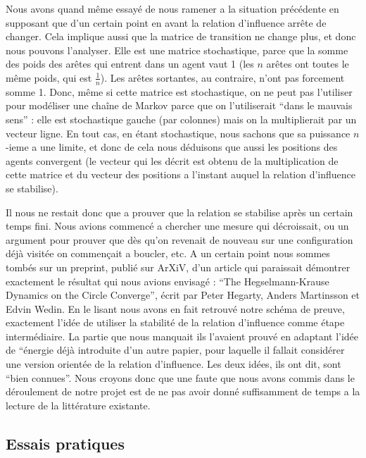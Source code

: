\documentclass[a4paper,10pt]{article}
\begin{document}
Nous avons quand même essayé de nous ramener a la situation précédente en supposant que d'un certain point en avant la relation d'influence arrête de changer. Cela implique aussi que la matrice de transition ne change plus, et donc nous pouvons l'analyser. Elle est une matrice stochastique, parce que la somme des poids des arêtes qui entrent dans un agent vaut 1 (les $n$ arêtes ont toutes le même poids, qui est $\frac{1}{n}$). Les arêtes sortantes, au contraire, n'ont pas forcement somme 1. Donc, même si cette matrice est stochastique, on ne peut pas l'utiliser pour modéliser une chaîne de Markov parce que on l'utiliserait ``dans le mauvais sens'' : elle est stochastique gauche (par colonnes) mais on la multiplierait par un vecteur ligne. En tout cas, en étant stochastique, nous sachons que sa puissance $n$-ieme a une limite, et donc de cela nous déduisons que aussi les positions des agents convergent (le vecteur qui les décrit est obtenu de la multiplication de cette matrice et du vecteur des positions a l'instant auquel la relation d'influence se stabilise).

Il nous ne restait donc que a prouver que la relation se stabilise après un certain temps fini. Nous avions commencé a chercher une mesure qui décroissait, ou un argument pour prouver que dès qu'on revenait de nouveau sur une configuration déjà visitée on commençait a boucler, etc. A un certain point nous sommes tombés sur un preprint, publié sur ArXiV, d'un article qui paraissait démontrer exactement le résultat qui nous avions envisagé : ``The Hegselmann-Krause Dynamics on the Circle Converge'', écrit par Peter Hegarty, Anders Martinsson et Edvin Wedin. En le lisant nous avons en fait retrouvé notre schéma de preuve, exactement l’idée de utiliser la stabilité de la relation d'influence comme étape intermédiaire. La partie que nous manquait ils l'avaient prouvé en adaptant l’idée de ``\'energie déjà introduite d'un autre papier, pour laquelle il fallait considérer une version orientée de la relation d'influence. Les deux idées, ils ont dit, sont ``bien connues''. Nous croyons donc que une faute que nous avons commis dans le déroulement de notre projet est de ne pas avoir donné suffisamment de temps a la lecture de la littérature existante.

\subsection{Essais pratiques}
\end{document}
